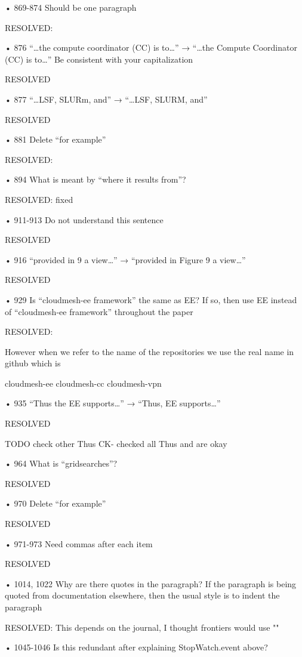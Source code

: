 • 869-874 Should be one paragraph

    RESOLVED:

• 876 “…the compute coordinator (CC) is to…” → “…the Compute Coordinator (CC) is
to…” Be consistent with your capitalization

    RESOLVED
    
• 877 “…LSF, SLURm, and” → “…LSF, SLURM, and”

    RESOLVED
    
• 881 Delete “for example”

    RESOLVED:
    
• 894 What is meant by “where it results from”?

    RESOLVED: fixed
    
• 911-913 Do not understand this sentence

    RESOLVED
    
• 916 “provided in 9 a view…” → “provided in Figure 9 a view…”

    RESOLVED 
    
• 929 Is “cloudmesh-ee framework” the same as EE? If so, then use EE instead of
“cloudmesh-ee framework” throughout the paper

    RESOLVED:

    However when we refer to the name of the repositories we use the real name in github which is 

    cloudmesh-ee
    cloudmesh-cc
    cloudmesh-vpn

• 935 “Thus the EE supports…” → “Thus, EE supports…”

    RESOLVED

    TODO check other Thus
    CK- checked all Thus and are okay
    
• 964 What is “gridsearches”?

    RESOLVED

• 970 Delete “for example”

    RESOLVED

• 971-973 Need commas after each item

    RESOLVED
    
• 1014, 1022 Why are there quotes in the paragraph? If the paragraph is being quoted from
documentation elsewhere, then the usual style is to indent the paragraph

    RESOLVED: This depends on the journal, I thought frontiers would use ""
    
• 1045-1046 Is this redundant after explaining StopWatch.event above?

